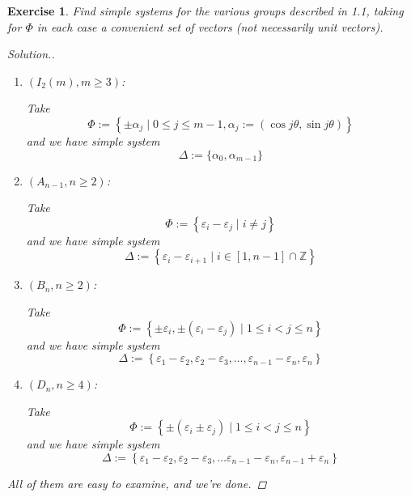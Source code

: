 \documentclass{article}
\theoremstyle{breakstyle}
\newtheorem{exercise}{Exercise}[section]
\newenvironment{solution}
  {\begin{proof}[Solution.]\renewcommand{\qedsymbol}{}}
  {\end{proof}}
\begin{document}
\begin{exercise}
Find simple systems for the various groups described in 1.1, taking for $\Phi$ in each case a convenient set of vectors (not necessarily unit vectors).

\begin{solution}
    \begin{enumerate}[label=({\roman*})]
        \item $\left( I_2\left( m \right) ,m\ge 3 \right) $:

            Take
            $$
            \Phi := \left\{ \pm \alpha_j \mid 0 \le j \le m-1,\alpha_j :=\left( \cos j\theta, \sin j\theta \right)  \right\} 
            $$
            and we have simple system
            $$
            \Delta := \{\alpha_0, \alpha_{m-1}\}
            $$
        \item $\left( A_{n-1},n\ge 2 \right) $:

            Take
            $$
            \Phi:=\left\{ \varepsilon_{i}-\varepsilon_{j}\mid i\neq j \right\} 
            $$
            and we have simple system
            $$
            \Delta:=\left\{ \varepsilon_{i}-\varepsilon_{i+1}\mid i\in
            [1,n-1]\cap \mathbb{Z} \right\} 
            $$
        \item $\left( B_{n},n\ge 2 \right) $:

            Take
            $$
            \Phi:=\left\{ \pm \varepsilon_{i},\pm \left(
            \varepsilon_{i}-\varepsilon_{j} \right) \mid 1\le i<j\le n \right\}
            $$
            and we have simple system
            $$
            \Delta:=\left\{
            \varepsilon_1-\varepsilon_2,\varepsilon_2-\varepsilon_3,\ldots
        ,\varepsilon_{n-1}-\varepsilon_{n},\varepsilon_{n} \right\} 
            $$
        \item $\left( D_{n},n\ge 4 \right) $:

            Take
            $$
            \Phi:=\left\{ \pm \left( \varepsilon_{i}\pm \varepsilon_{j} \right)
            \mid 1\le i<j\le n\right\} 
            $$
            and we have simple system
            $$
            \Delta:=\left\{
            \varepsilon_1-\varepsilon_2,\varepsilon_2-\varepsilon_3,\ldots
        \varepsilon_{n-1}-\varepsilon_{n},\varepsilon_{n-1}+\varepsilon_{n} \right\} 
            $$
    \end{enumerate}
    All of them are easy to examine, and we're done.
\end{solution}

\end{exercise}
\end{document}
